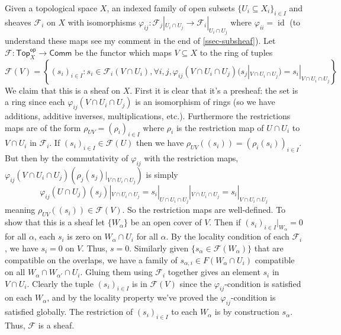 \documentclass[12pt,letter]{article}
\newcommand{\id}[0]{\operatorname{id}}
\newcommand{\Top}[0]{\mathsf{Top}}
\newcommand{\op}[0]{\mathsf{op}}
\begin{document}
	Given a topological space $X$, an indexed family of open subsets $\{U_i\subseteq X_i\}_{i\in I}$ and sheaves $\mathscr F_i$ on $X$ with isomorphisms $\varphi_{ij}:\mathscr F_j|_{U_i\cap U_j}\to \mathscr F_i|_{U_i\cap U_j}$ where $\varphi_{ii}=\id$ (to understand these maps see my comment in the end of \ref{ssec-subsheaf}). Let $\mathscr F:\Top_X^\op\to\mathsf{Comm}$ be the functor which maps $V\subseteq X$ to the ring of tuples
	\[\mathscr F(V)=\left\{(s_i)_{i\in I}:s_i\in \mathscr F_i(V\cap U_i),\forall i,j,\varphi_{ij}(V\cap U_i\cap U_j)(s_j|_{V\cap U_i\cap U_j})=s_i|_{V\cap U_i\cap U_j}\right\}\]
	We claim that this is a sheaf on $X$. First it is clear that it's a presheaf: the set is a ring since each $\varphi_{ij}(V\cap U_i\cap U_j)$ is an isomorphism of rings (so we have additions, additive inverses, multiplications, etc.). Furthermore the restrictions maps are of the form $\rho_{UV}=(\rho_i)_{i\in I}$ where $\rho_i$ is the restriction map of $U\cap U_i$ to $V\cap U_i$ in $\mathscr F_i$. If $(s_i)_{i\in I}\in \mathscr F(U)$ then we have $\rho_{UV}((s_i))=(\rho_i(s_i))_{i\in I}$. But then by the commutativity of $\varphi_{ij}$ with the restriction maps, $\varphi_{ij}(V\cap U_i\cap U_j)(\rho_j(s_j)|_{V\cap U_i\cap U_j})$ is simply 
	\[\varphi_{ij}(U\cap U_j)(s_j)|_{V\cap U_i\cap U_j}=s_i|_{U\cap U_i\cap U_j}|_{V\cap U_i\cap U_j}=s_i|_{V\cap U_i\cap U_j}\]
	meaning $\rho_{UV}((s_i))\in \mathscr F(V)$. So the restriction maps are well-defined. To show that this is a sheaf let $\{W_\alpha\}$ be an open cover of $V$. Then if $(s_i)_{i\in I}|_{W_\alpha}=0$ for all $\alpha$, each $s_i$ is zero on $W_\alpha\cap U_i$ for all $\alpha$. By the locality condition of each $\mathscr F_i$, we have $s_i=0$ on $V$. Thus, $s=0$. Similarly given $\{s_\alpha\in \mathscr F(W_\alpha)\}$ that are compatible on the overlaps, we have a family of $s_{\alpha, i}\in F(W_\alpha\cap U_i)$ compatible on all $W_\alpha\cap W_{\alpha'}\cap U_i$. Gluing them using $\mathscr F_i$ together gives an element $s_i$ in $V\cap U_i$. Clearly the tuple $(s_i)_{i\in I}$ is in $\mathscr F(V)$ since the $\varphi_{ij}$-condition is satisfied on each $W_\alpha$, and by the locality property we've proved the $\varphi_{ij}$-condition is satisfied globally. The restriction of $(s_i)_{i\in I}$ to each $W_\alpha$ is by construction $s_{\alpha}$. Thus, $\mathscr F$ is a sheaf.
	
\end{document}
